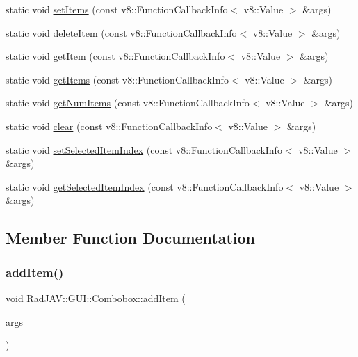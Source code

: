 \begin{DoxyCompactItemize}
\item 
static void \mbox{\hyperlink{class_rad_j_a_v_1_1_g_u_i_1_1_combobox_a7ece0fe3bf0c1cccbbd69706927b8b60}{set\+Items}} (const v8\+::\+Function\+Callback\+Info$<$ v8\+::\+Value $>$ \&args)
\item 
static void \mbox{\hyperlink{class_rad_j_a_v_1_1_g_u_i_1_1_combobox_aa926ce398debc4f2318dd6f4e9ac177a}{delete\+Item}} (const v8\+::\+Function\+Callback\+Info$<$ v8\+::\+Value $>$ \&args)
\item 
static void \mbox{\hyperlink{class_rad_j_a_v_1_1_g_u_i_1_1_combobox_a54869bcead62f1227390f84929c4b13d}{get\+Item}} (const v8\+::\+Function\+Callback\+Info$<$ v8\+::\+Value $>$ \&args)
\item 
static void \mbox{\hyperlink{class_rad_j_a_v_1_1_g_u_i_1_1_combobox_aee899a33177f5444e387d3d3d3510472}{get\+Items}} (const v8\+::\+Function\+Callback\+Info$<$ v8\+::\+Value $>$ \&args)
\item 
static void \mbox{\hyperlink{class_rad_j_a_v_1_1_g_u_i_1_1_combobox_a15133a743e7d54da1f49012db693a610}{get\+Num\+Items}} (const v8\+::\+Function\+Callback\+Info$<$ v8\+::\+Value $>$ \&args)
\item 
static void \mbox{\hyperlink{class_rad_j_a_v_1_1_g_u_i_1_1_combobox_a05fea822849d6eb80ec814631cddadfb}{clear}} (const v8\+::\+Function\+Callback\+Info$<$ v8\+::\+Value $>$ \&args)
\item 
static void \mbox{\hyperlink{class_rad_j_a_v_1_1_g_u_i_1_1_combobox_a997141a6222cc440631b7bdcc96223be}{set\+Selected\+Item\+Index}} (const v8\+::\+Function\+Callback\+Info$<$ v8\+::\+Value $>$ \&args)
\item 
static void \mbox{\hyperlink{class_rad_j_a_v_1_1_g_u_i_1_1_combobox_ace7d97ffffbbc598705ef59bf5e58ece}{get\+Selected\+Item\+Index}} (const v8\+::\+Function\+Callback\+Info$<$ v8\+::\+Value $>$ \&args)
\end{DoxyCompactItemize}


\subsection{Member Function Documentation}
\mbox{\label{class_rad_j_a_v_1_1_g_u_i_1_1_combobox_ab4f4dc21d1a67c3144a897db4c7efd48}} 
\subsubsection{\texorpdfstring{add\+Item()}{addItem()}}
{\footnotesize\ttfamily void Rad\+J\+A\+V\+::\+G\+U\+I\+::\+Combobox\+::add\+Item (\begin{DoxyParamCaption}\item[{const v8\+::\+Function\+Callback\+Info$<$ v8\+::\+Value $>$ \&}]{args }\end{DoxyParamCaption})\hspace{0.3cm}{\ttfamily [static]}}

